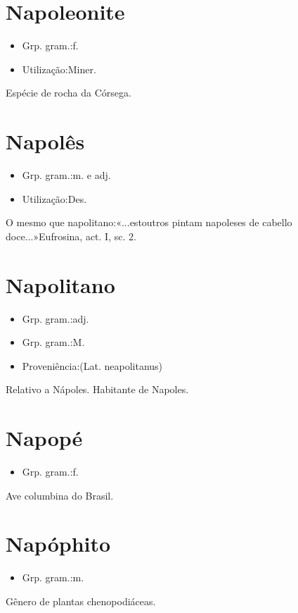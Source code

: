 \section{Napoleonite}
\begin{itemize}
\item {Grp. gram.:f.}
\end{itemize}
\begin{itemize}
\item {Utilização:Miner.}
\end{itemize}
Espécie de rocha da Córsega.
\section{Napolês}
\begin{itemize}
\item {Grp. gram.:m. e adj.}
\end{itemize}
\begin{itemize}
\item {Utilização:Des.}
\end{itemize}
O mesmo que \textunderscore napolitano\textunderscore :«\textunderscore ...estoutros pintam napoleses de cabello doce...\textunderscore »\textunderscore Eufrosina\textunderscore , act. I, sc. 2.
\section{Napolitano}
\begin{itemize}
\item {Grp. gram.:adj.}
\end{itemize}
\begin{itemize}
\item {Grp. gram.:M.}
\end{itemize}
\begin{itemize}
\item {Proveniência:(Lat. \textunderscore neapolitanus\textunderscore )}
\end{itemize}
Relativo a Nápoles.
Habitante de Napoles.
\section{Napopé}
\begin{itemize}
\item {Grp. gram.:f.}
\end{itemize}
Ave columbina do Brasil.
\section{Napóphito}
\begin{itemize}
\item {Grp. gram.:m.}
\end{itemize}
Gênero de plantas chenopodiáceas.
